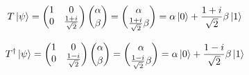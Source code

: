\[T\ket{\psi} = 
\begin{pmatrix}
1 & 0 \\
0 & \frac{1 + i}{\sqrt{2}} \\
\end{pmatrix}\binom{\alpha}{\beta} = \binom{\alpha}{\frac{1 + i}{\sqrt{2}}\beta} = \alpha\ket{0} + \frac{1 + i}{\sqrt{2}}\beta\ket{1}\]

\[T^{\dag}\ket{\psi} = 
\begin{pmatrix}
1 & 0 \\
0 & \frac{1 - i}{\sqrt{2}} \\
\end{pmatrix}\binom{\alpha}{\beta} = \binom{\alpha}{\frac{1 - i}{\sqrt{2}}\beta} = \alpha\ket{0} + \frac{1 - i}{\sqrt{2}}\beta\ket{1}\]
